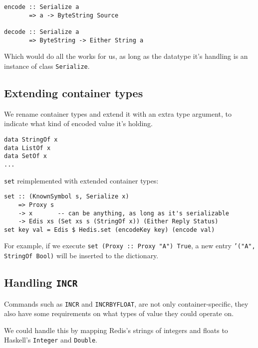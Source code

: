 \documentclass[pldi]{sigplanconf-pldi16}
\begin{document}
\begin{verbatim}
encode :: Serialize a
       => a -> ByteString Source

decode :: Serialize a
       => ByteString -> Either String a
\end{verbatim}

Which would do all the works for us, as long as the datatype it's handling is
 an instance of class \texttt{Serialize}.\footnotemark


\subsection{Extending container types}
We rename container types and extend it with an extra type argument,
 to indicate what kind of encoded value it's holding.

\begin{verbatim}
data StringOf x
data ListOf x
data SetOf x
...
\end{verbatim}

\texttt{set} reimplemented with extended container types:

\begin{verbatim}
set :: (KnownSymbol s, Serialize x)
    => Proxy s
    -> x       -- can be anything, as long as it's serializable
    -> Edis xs (Set xs s (StringOf x)) (Either Reply Status)
set key val = Edis $ Hedis.set (encodeKey key) (encode val)
\end{verbatim}

For example, if we execute \texttt{set (Proxy :: Proxy "A") True},
 a new entry \texttt{'}\texttt{("A", StringOf Bool)} will
 be inserted to the dictionary.

\subsection{Handling \texttt{INCR}}

Commands such as \texttt{INCR} and \texttt{INCRBYFLOAT}, are
 not only container-specific, they also have some requirements on what types of
 value they could operate on.

We could handle this by mapping Redis's strings of integers and floats to
 Haskell's \texttt{Integer} and \texttt{Double}.
\end{document}
